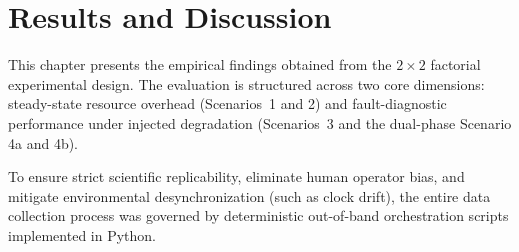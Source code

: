 \chapter{Results and Discussion}
\label{chap:results-and-discussion}

This chapter presents the empirical findings obtained from the $2 \times 2$ factorial experimental design. The evaluation is structured across two core dimensions: steady-state resource overhead (Scenarios~1 and 2) and fault-diagnostic performance under injected degradation (Scenarios~3 and the dual-phase Scenario 4a and 4b). 

To ensure strict scientific replicability, eliminate human operator bias, and mitigate environmental desynchronization (such as clock drift), the entire data collection process was governed by deterministic out-of-band orchestration scripts implemented in Python.





